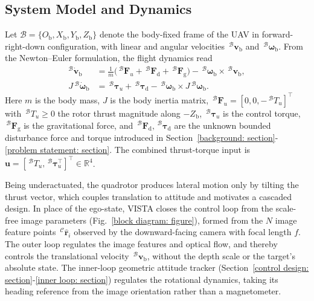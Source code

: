 \documentclass{IEEEtaes}
\theoremstyle{definition}
\theoremstyle{remark}
\begin{document}
\subsection{System Model and Dynamics} \label{quadrotor dynamics: section}
Let $\mathcal{B}=\{O_{\text{b}},X_{\text{b}},Y_{\text{b}},Z_{\text{b}}\}$ denote the body-fixed frame of the UAV in forward-right-down configuration, with linear and angular velocities $\,^\mathcal{B}\boldsymbol{v}_\text{b}$ and $\,^\mathcal{B}\boldsymbol{\omega}_\text{b}$. From the Newton--Euler formulation, the flight dynamics read
\begin{equation}
\label{quadrotor dynamics: equation}
    \begin{aligned}
    ^\mathcal{B}\dot{\boldsymbol{v}}_\text{b} &= \tfrac{1}{m}\big(\,^\mathcal{B}\boldsymbol{F}_u + \,^\mathcal{B}\boldsymbol{F}_\text{d} + \,^\mathcal{B}\boldsymbol{F}_\text{g}\big) - \,^\mathcal{B}\boldsymbol{\omega}_\text{b}\times\,^\mathcal{B}\boldsymbol{v}_\text{b},\\
    J\,^\mathcal{B}\dot{\boldsymbol{\omega}}_\text{b} &= \,^\mathcal{B}\boldsymbol{\tau}_u + \,^\mathcal{B}\boldsymbol{\tau}_\text{d} - \,^\mathcal{B}\boldsymbol{\omega}_\text{b}\times J\,^\mathcal{B}\boldsymbol{\omega}_\text{b}.
    \end{aligned}
 \end{equation}
Here $m$ is the body mass, $J$ is the body inertia matrix, $\,^\mathcal{B} \boldsymbol{F}_u = [0,0,-\,^\mathcal{B} T_u]^\top$ with $\,^\mathcal{B} T_u\ge 0$ the rotor thrust magnitude along $-Z_\text{b}$, $\,^\mathcal{B} \boldsymbol{\tau}_u$ is the control torque, $\,^\mathcal{B} \boldsymbol{F}_\text{g}$ is the gravitational force, and $\,^\mathcal{B} \boldsymbol{F}_\text{d},\,^\mathcal{B} \boldsymbol{\tau}_\text{d}$ are the unknown bounded disturbance force and torque introduced in Section~\ref{background: section}-\ref{problem statement: section}. The combined thrust-torque input is $\boldsymbol{u}=[\,^\mathcal{B}T_u,\,^\mathcal{B}\boldsymbol{\tau}_u^\top]^\top\in\mathbb{R}^4$.

Being underactuated, the quadrotor produces lateral motion only by tilting the thrust vector, which couples translation to attitude and motivates a cascaded design. In place of the ego-state, VISTA closes the control loop from the scale-free image parameters (Fig.~\ref{block diagram: figure}), formed from the $N$ image feature points $\,^\mathcal{C}\hat{\boldsymbol{r}}_i$ observed by the downward-facing camera with focal length $f$. The outer loop regulates the image features and optical flow, and thereby controls the translational velocity $\,^\mathcal{B}\boldsymbol{v}_\text{b}$, without the depth scale or the target's absolute state. The inner-loop geometric attitude tracker (Section~\ref{control design: section}-\ref{inner loop: section}) regulates the rotational dynamics, taking its heading reference from the image orientation rather than a magnetometer.
\end{document}
